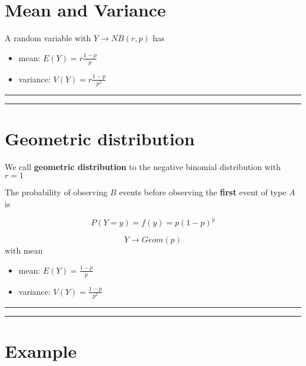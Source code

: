 \documentclass[
]{book}
\begin{document}
\hypertarget{mean-and-variance-2}{%
\section{Mean and Variance}\label{mean-and-variance-2}}

A random variable with \(Y\rightarrow NB(r,p)\) has

\begin{itemize}
\item
  mean: \(E(Y)= r\frac{1-p}{p}\)
\item
  variance: \(V(Y)= r\frac{1-p}{p^2}\)
\end{itemize}

\begin{center}\rule{0.5\linewidth}{0.5pt}\end{center}

\begin{center}\rule{0.5\linewidth}{0.5pt}\end{center}

\hypertarget{geometric-distribution}{%
\section{Geometric distribution}\label{geometric-distribution}}

We call \textbf{geometric distribution} to the negative binomial distribution with \(r=1\)

The probability of observing \(B\) events before observing the \textbf{first} event of type \(A\) is

\[P(Y=y)=f(y)= p(1-p)^y\]

\[Y\rightarrow Geom(p)\]
with mean

\begin{itemize}
\item
  mean: \(E(Y)= \frac{1-p}{p}\)
\item
  variance: \(V(Y)= \frac{1-p}{p^2}\)
\end{itemize}

\begin{center}\rule{0.5\linewidth}{0.5pt}\end{center}

\begin{center}\rule{0.5\linewidth}{0.5pt}\end{center}

\hypertarget{example-9}{%
\section{Example}\label{example-9}}
\end{document}
